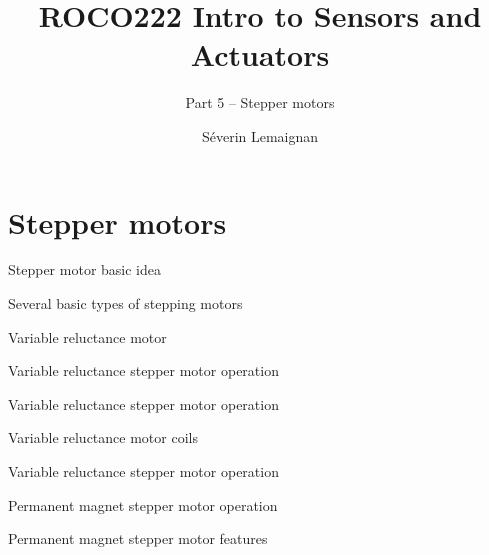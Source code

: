 \documentclass[compress]{beamer}
\title{ROCO222 \newline Intro to Sensors and Actuators}
\subtitle{Part 5 -- Stepper motors}
\date{}
\author{Séverin Lemaignan}
\institute{Centre for Neural Systems and Robotics\\{\bf Plymouth University}}
\begin{document}

\maketitle

\section{Stepper motors}
{
    \begin{frame}{Stepper motor basic idea}
    \end{frame}
}

{
    \begin{frame}{Several basic types of stepping motors}
    \end{frame}
}

{
    \begin{frame}{Variable reluctance motor}
    \end{frame}
}

{
    \begin{frame}{Variable reluctance stepper motor operation}
    \end{frame}
}

{
    \begin{frame}{Variable reluctance stepper motor operation}
    \end{frame}
}

{
    \begin{frame}{Variable reluctance motor coils}
    \end{frame}
}

{
    \begin{frame}{Variable reluctance stepper motor operation}
    \end{frame}
}

{
    \begin{frame}{Permanent magnet stepper motor operation}
    \end{frame}
}

{
    \begin{frame}{Permanent magnet stepper motor features}
    \end{frame}
}
\end{document}
